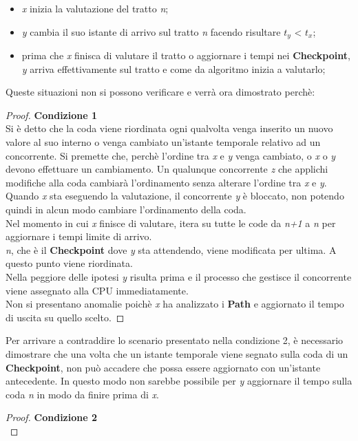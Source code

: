 \begin{itemize}
\begin{itemize}
\item \emph{x} inizia la valutazione del tratto \emph{n};
\item \emph{y} cambia il suo istante di arrivo sul tratto \emph{n} facendo risultare $t_y$ < $t_x$;
\item prima che \emph{x} finisca di valutare il tratto o aggiornare i tempi nei \textbf{Checkpoint}, \emph{y} arriva effettivamente sul 
tratto e come da algoritmo inizia a valutarlo;
\end{itemize}
Queste situazioni non si possono verificare e verrà ora dimostrato perchè:
\begin{proof} \textbf{Condizione 1}\\
Si è detto che la coda viene riordinata ogni qualvolta venga inserito un nuovo valore al suo interno o venga cambiato un'istante temporale
relativo ad un concorrente. Si premette che, perchè l'ordine tra \emph{x} e \emph{y} venga cambiato, o \emph{x} o \emph{y} devono effettuare
un cambiamento. Un qualunque concorrente \emph{z} che applichi modifiche alla coda cambiarà l'ordinamento senza alterare l'ordine tra \emph{x}
e \emph{y}.\\
Quando \emph{x} sta eseguendo la valutazione, il concorrente \emph{y} è bloccato, non potendo quindi in alcun modo cambiare l'ordinamento della 
coda.\\ 
Nel momento in cui \emph{x} finisce di valutare, itera su tutte le code da \emph{n+1} a \emph{n} per aggiornare i tempi limite di arrivo.\\
\emph{n}, che è il \textbf{Checkpoint} dove \emph{y} sta attendendo, viene modificata per ultima. A questo punto viene riordinata.\\
Nella peggiore delle ipotesi \emph{y} risulta prima e il processo che gestisce il concorrente viene assegnato alla CPU immediatamente.\\
Non si presentano anomalie poichè \emph{x} ha analizzato i \textbf{Path} e aggiornato il tempo di uscita su quello scelto. %
\end{proof}
Per arrivare a contraddire lo scenario presentato nella condizione 2, è necessario dimostrare che una volta che un istante temporale
viene segnato sulla coda di un \textbf{Checkpoint}, non può accadere che possa essere aggiornato con un'istante antecedente. In questo modo
non sarebbe possibile per \emph{y} aggiornare il tempo sulla coda \emph{n} in modo da finire prima di \emph{x}.
\begin{proof} \textbf{Condizione 2}\\

\end{proof}
\end{itemize}
